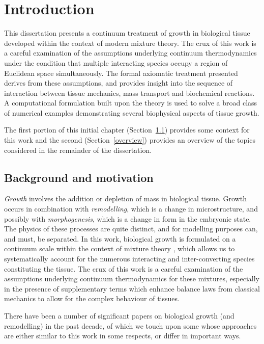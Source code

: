 \chapter{Introduction}
\label{introduction}

This dissertation presents a continuum treatment of growth in
biological tissue developed within the context of modern mixture
theory. The crux of this work is a careful examination of the
assumptions underlying continuum thermodynamics under the condition
that multiple interacting species occupy a region of Euclidean space
simultaneously. The formal axiomatic treatment presented derives from
these assumptions, and provides insight into the sequence of
interaction between tissue mechanics, mass transport and biochemical
reactions. A computational formulation built upon the theory is used
to solve a broad class of numerical examples demonstrating several
biophysical aspects of tissue growth.

The first portion of this initial chapter (Section~\ref{background})
provides some context for this work and the second
(Section~\ref{overview}) provides an overview of the topics considered
in the remainder of the dissertation.

\section{Background and motivation}
\label{background}

\emph{Growth} involves the addition or depletion of mass in biological
tissue. Growth occurs in combination with \emph{remodelling}, which is
a change in microstructure, and possibly with \emph{morphogenesis},
which is a change in form in the embryonic state. The physics of these
processes are quite distinct, and for modelling purposes can, and
must, be separated. In this work, biological growth is formulated on a
continuum scale within the context of mixture theory
\citep{TruesdellToupin:60, TruesdellNoll:65, BedfordDrumheller:1983},
which allows us to systematically account for the numerous interacting
and inter-converting species constituting the tissue. The crux of this
work is a careful examination of the assumptions underlying continuum
thermodynamics for these mixtures, especially in the presence of
supplementary terms which enhance balance laws from classical
mechanics to allow for the complex behaviour of tissues.

There have been a number of significant papers on biological growth
(and remodelling) in the past decade, of which we touch upon some whose
approaches are either similar to this work in some respects, or differ
in important ways.

